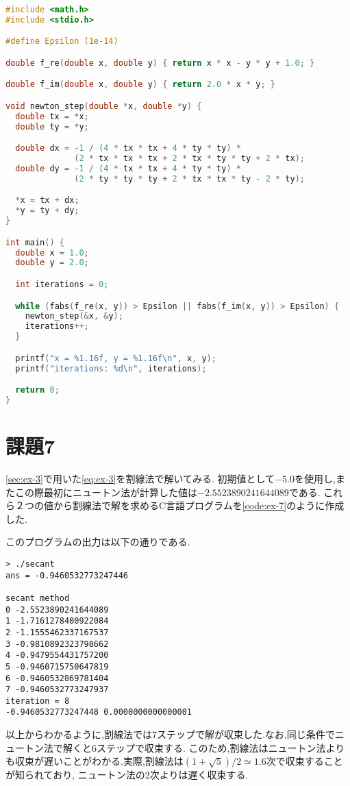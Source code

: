 \documentclass[autodetect-engine, dvi=dvipdfmx, 10pt, a4paper, ja=standard]{bxjsarticle}
\begin{document}
\begin{lstlisting}[language={C}, caption={課題6で使用したソースコード}, label={code:ex-6}]
#include <math.h>
#include <stdio.h>

#define Epsilon (1e-14)

double f_re(double x, double y) { return x * x - y * y + 1.0; }

double f_im(double x, double y) { return 2.0 * x * y; }

void newton_step(double *x, double *y) {
  double tx = *x;
  double ty = *y;

  double dx = -1 / (4 * tx * tx + 4 * ty * ty) *
			  (2 * tx * tx * tx + 2 * tx * ty * ty + 2 * tx);
  double dy = -1 / (4 * tx * tx + 4 * ty * ty) *
			  (2 * ty * ty * ty + 2 * tx * tx * ty - 2 * ty);

  *x = tx + dx;
  *y = ty + dy;
}

int main() {
  double x = 1.0;
  double y = 2.0;

  int iterations = 0;

  while (fabs(f_re(x, y)) > Epsilon || fabs(f_im(x, y)) > Epsilon) {
	newton_step(&x, &y);
	iterations++;
  }

  printf("x = %1.16f, y = %1.16f\n", x, y);
  printf("iterations: %d\n", iterations);

  return 0;
}

\end{lstlisting}

\section{課題7}

\ref{sec:ex-3}で用いた\ref{eq:ex-3}を割線法で解いてみる.
初期値として$-5.0$を使用し,またこの際最初にニュートン法が計算した値は$-2.5523890241644089$である.
これら２つの値から割線法で解を求めるC言語プログラムを\ref{code:ex-7}のように作成した.

このプログラムの出力は以下の通りである.
\begin{verbatim}
> ./secant
ans = -0.9460532773247446

secant method
0 -2.5523890241644089
1 -1.7161278400922084
2 -1.1555462337167537
3 -0.9810892323798662
4 -0.9479554431757200
5 -0.9460715750647819
6 -0.9460532869781404
7 -0.9460532773247937
iteration = 8
-0.9460532773247448 0.0000000000000001
\end{verbatim}

以上からわかるように,割線法では7ステップで解が収束した.なお,同じ条件でニュートン法で解くと6ステップで収束する.
このため,割線法はニュートン法よりも収束が遅いことがわかる.実際,割線法は$(1 + \sqrt{5}) / 2 \simeq 1.6$次で収束することが知られており,
ニュートン法の2次よりは遅く収束する.
\end{document}

